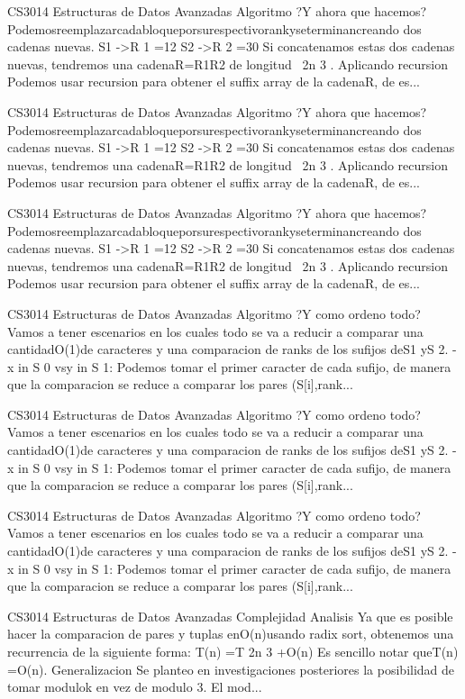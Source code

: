 \begin{description}[leftmargin=!,labelwidth=4.2em,style=nextline]
\item[Pag. 32] CS3014 Estructuras de Datos Avanzadas Algoritmo ?Y ahora que hacemos? Podemosreemplazarcadabloqueporsurespectivorankyseterminancreando dos cadenas nuevas. S1 ->R 1 =12 S2 ->R 2 =30 Si concatenamos estas dos cadenas nuevas, tendremos una cadenaR=R1R2 de longitud~ 2n 3 . Aplicando recursion Podemos usar recursion para obtener el suffix array de la cadenaR, de es...
\item[Pag. 33] CS3014 Estructuras de Datos Avanzadas Algoritmo ?Y ahora que hacemos? Podemosreemplazarcadabloqueporsurespectivorankyseterminancreando dos cadenas nuevas. S1 ->R 1 =12 S2 ->R 2 =30 Si concatenamos estas dos cadenas nuevas, tendremos una cadenaR=R1R2 de longitud~ 2n 3 . Aplicando recursion Podemos usar recursion para obtener el suffix array de la cadenaR, de es...
\item[Pag. 34] CS3014 Estructuras de Datos Avanzadas Algoritmo ?Y ahora que hacemos? Podemosreemplazarcadabloqueporsurespectivorankyseterminancreando dos cadenas nuevas. S1 ->R 1 =12 S2 ->R 2 =30 Si concatenamos estas dos cadenas nuevas, tendremos una cadenaR=R1R2 de longitud~ 2n 3 . Aplicando recursion Podemos usar recursion para obtener el suffix array de la cadenaR, de es...
\item[Pag. 35] CS3014 Estructuras de Datos Avanzadas Algoritmo ?Y como ordeno todo? Vamos a tener escenarios en los cuales todo se va a reducir a comparar una cantidadO(1)de caracteres y una comparacion de ranks de los sufijos deS1 yS 2. -x in  S 0 vsy in  S 1: Podemos tomar el primer caracter de cada sufijo, de manera que la comparacion se reduce a comparar los pares (S[i],rank...
\item[Pag. 36] CS3014 Estructuras de Datos Avanzadas Algoritmo ?Y como ordeno todo? Vamos a tener escenarios en los cuales todo se va a reducir a comparar una cantidadO(1)de caracteres y una comparacion de ranks de los sufijos deS1 yS 2. -x in  S 0 vsy in  S 1: Podemos tomar el primer caracter de cada sufijo, de manera que la comparacion se reduce a comparar los pares (S[i],rank...
\item[Pag. 37] CS3014 Estructuras de Datos Avanzadas Algoritmo ?Y como ordeno todo? Vamos a tener escenarios en los cuales todo se va a reducir a comparar una cantidadO(1)de caracteres y una comparacion de ranks de los sufijos deS1 yS 2. -x in  S 0 vsy in  S 1: Podemos tomar el primer caracter de cada sufijo, de manera que la comparacion se reduce a comparar los pares (S[i],rank...
\item[Pag. 38] CS3014 Estructuras de Datos Avanzadas Complejidad Analisis Ya que es posible hacer la comparacion de pares y tuplas enO(n)usando radix sort, obtenemos una recurrencia de la siguiente forma: T(n) =T  2n 3   +O(n) Es sencillo notar queT(n) =O(n). Generalizacion Se planteo en investigaciones posteriores la posibilidad de tomar modulok en vez de modulo 3. El mod...

\end{description}
